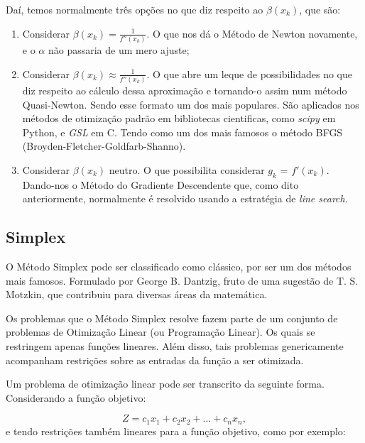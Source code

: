 Daí, temos normalmente três opções no que diz respeito ao \(\beta(x_k)\),
que são:

\begin{enumerate}

    \item Considerar \(\beta(x_k) = \frac{1}{f''(x_k)}\). O que
        nos dá o Método de Newton novamente, e o \(\alpha\) não passaria de
        um mero ajuste;

    \item Considerar
        \(\beta(x_k) \approx \frac{1}{f''(x_k)}\). O que abre um leque de
        possibilidades no que diz respeito ao cálculo dessa aproximação
        e tornando-o assim num método Quasi-Newton. Sendo esse formato um dos
        mais populares. São aplicados nos métodos de otimização
        padrão em bibliotecas cientificas, como \textit{scipy} em Python,
        e \textit{GSL} em C. Tendo como um dos mais famosos o método BFGS
        (Broyden-Fletcher-Goldfarb-Shanno).

    \item Considerar \(\beta(x_k) \) neutro. O que possibilita considerar
        \(g_k\) = \(f'(x_k)\). Dando-nos o Método do Gradiente Descendente
        que, como dito anteriormente, normalmente é resolvido usando a
        estratégia de \textit{line search}.

\end{enumerate}

\subsection{Simplex}

\hspace{0.8cm}
O Método Simplex pode ser classificado como clássico, por ser um
dos métodos mais famosos. Formulado por George B. Dantzig, fruto de uma
sugestão de T. S. Motzkin, que contribuiu para diversas áreas da
matemática.

Os problemas que o Método Simplex resolve fazem parte de um conjunto de
problemas de Otimização Linear (ou Programação Linear). Os quais se restringem
apenas funções lineares. Além disso, tais problemas genericamente acompanham
restrições sobre as entradas da função a ser otimizada.

Um problema de otimização linear pode ser transcrito da seguinte forma.
Considerando a função objetivo:

\begin{equation}
        Z = c_1x_1 + c_2x_2 + … + c_nx_n,
\end{equation}
e tendo restrições também lineares para a função objetivo, como por exemplo:

